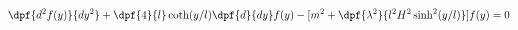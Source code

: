 \begin{equation} %
\dpf{d^2 f(y)}{dy^2}+\dpf{4}{l}\coth(y/l)\dpf{d}{dy}f(y)-[m^2+\dpf{\lambda^2}{l^2 H^2 \sinh^2(y/l)}]f(y)=0
\end{equation}

